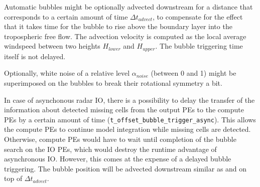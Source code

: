 \documentclass[10pt,a4paper,twoside,headinclude,footinclude,parskip=half]{scrartcl}
\newcommand{\paramform}[1]{\mbox{\texttt{#1}}\xspace}%
\newlength{\lenspeins}%
\newlength{\lenspzwei}%
\newlength{\lenspdrei}%
\newlength{\lenspvier}%
\begin{document}
Automatic bubbles might be optionally advected downstream for a distance that corresponds to a certain amount of time $\Delta t_{advect}$, to compensate
for the effect that it takes time for the bubble to rise above the boundary layer into
the tropospheric free flow. The advection velocity is computed as the local average windspeed
between two heights $H_{lower}$ and $H_{upper}$. The bubble triggering time itself is not delayed.

Optionally, white noise of a relative level $\alpha_{noise}$ (between 0 and 1) might be superimposed
on the bubbles to break their rotational symmetry a bit.

In case of asynchonous radar IO, there is a possibility to delay the transfer of the information about detected
missing cells from the output PEs to the compute PEs by a certain amount of time (\paramform{t_offset_bubble_trigger_async}). This allows the compute PEs to
continue model integration while missing cells are detected. Otherwise, compute PEs would have to wait until completion of
the bubble search on the IO PEs, which would destroy the runtime advantage of asynchronous IO. However, this comes at the expense of
a delayed bubble triggering. The bubble position will be advected downstream similar as and on top of $\Delta t_{advect}$.

\setlength{\extrarowheight}{0.25\baselineskip}
\end{document}
